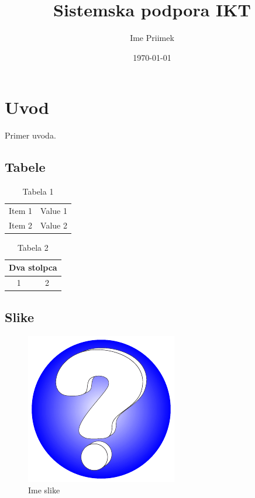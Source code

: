 \documentclass[a4paper,12pt]{article}
\title{Sistemska podpora IKT}
\date{\today}
\author{Ime Priimek}
\begin{document}
\tableofcontents

\listoffigures

\listoftables

\maketitle
 
\newpage

\section{Uvod}  
Primer uvoda.

\subsection{Tabele}

\begin{table}[htb]
\centering
\begin{tabular}{|c|c|}
  \hline
  Item 1 & Value 1 \\
  Item 2 & Value 2 \\
  \hline
\end{tabular}
  \caption{Tabela 1}
\end{table}

\begin{table}[htb]
\centering
\begin{tabular}{|c|c|}
\hline
\multicolumn{2}{|c|}{Dva stolpca} \\
\hline
1 & 2 \\
\hline
\end{tabular}
\caption{Tabela 2}
\end{table}

\subsection{Slike}

\begin{figure}[htb]                
\centering
\includegraphics{vprasaj.pdf}
\caption{Ime slike}
\end{figure}
\end{document}
